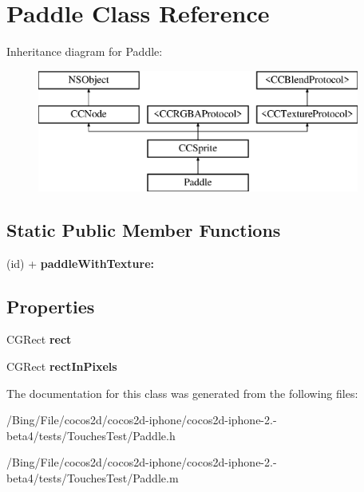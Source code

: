 \hypertarget{interface_paddle}{\section{Paddle Class Reference}
\label{interface_paddle}
}
Inheritance diagram for Paddle\-:\begin{figure}[H]
\begin{center}
\leavevmode
\includegraphics[height=4.000000cm]{interface_paddle}
\end{center}
\end{figure}
\subsection*{Static Public Member Functions}
\begin{DoxyCompactItemize}
\item 
\hypertarget{interface_paddle_ad6bbc06bdd214ab780a74f4dcbf4ff6f}{(id) + {\bfseries paddle\-With\-Texture\-:}}\label{interface_paddle_ad6bbc06bdd214ab780a74f4dcbf4ff6f}

\end{DoxyCompactItemize}
\subsection*{Properties}
\begin{DoxyCompactItemize}
\item 
\hypertarget{interface_paddle_a5f8f4bfb1e26387937f92e650f5fed10}{C\-G\-Rect {\bfseries rect}}\label{interface_paddle_a5f8f4bfb1e26387937f92e650f5fed10}

\item 
\hypertarget{interface_paddle_abc21f33b2294cef25cc9d4604cdf73ab}{C\-G\-Rect {\bfseries rect\-In\-Pixels}}\label{interface_paddle_abc21f33b2294cef25cc9d4604cdf73ab}

\end{DoxyCompactItemize}


The documentation for this class was generated from the following files\-:\begin{DoxyCompactItemize}
\item 
/\-Bing/\-File/cocos2d/cocos2d-\/iphone/cocos2d-\/iphone-\/2.-\/beta4/tests/\-Touches\-Test/Paddle.\-h\item 
/\-Bing/\-File/cocos2d/cocos2d-\/iphone/cocos2d-\/iphone-\/2.-\/beta4/tests/\-Touches\-Test/Paddle.\-m\end{DoxyCompactItemize}
